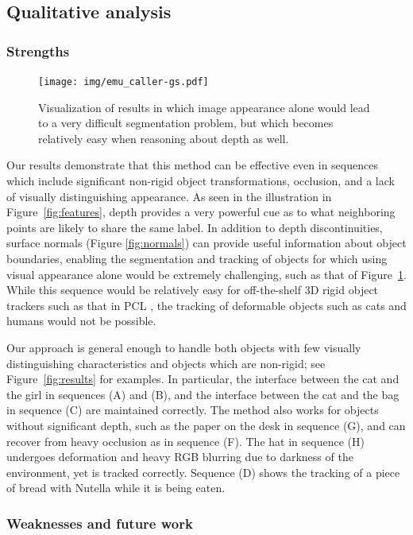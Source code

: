 \documentclass[graybox]{svmult}
\begin{document}
\subsection{Qualitative analysis}

\subsubsection{Strengths}

\begin{figure}
  \centering
  \texttt{[image: img/emu\_caller-gs.pdf]}
  \caption{Visualization of results in which image appearance alone would lead to a very difficult segmentation problem, but which becomes relatively easy when reasoning about depth as well.}
  \label{fig:emu}
\end{figure}

Our results demonstrate that this method can be effective even in sequences which include significant non-rigid object transformations, occlusion, and a lack of visually distinguishing appearance. As seen in the illustration in Figure~\ref{fig:features}, depth provides a very powerful cue as to what neighboring points are likely to share the same label.  In addition to depth discontinuities, surface normals (Figure \ref{fig:normals}) can provide useful information about object boundaries, enabling the segmentation and tracking of objects for which using visual appearance alone would be extremely challenging, such as that of Figure~\ref{fig:emu}. While this sequence would be relatively easy for off-the-shelf 3D rigid object trackers such as that in PCL \cite{rusu2011a}, the tracking of deformable objects such as cats and humans would not be possible.

Our approach is general enough to handle both objects with few visually distinguishing characteristics and objects which are non-rigid; see Figure~\ref{fig:results} for examples.  In particular, the interface between the cat and the girl in sequences (A) and (B), and the interface between the cat and the bag in sequence (C) are maintained correctly. The method also works for objects without significant depth, such as the paper on the desk in sequence (G), and can recover from heavy occlusion as in sequence (F).  The hat in sequence (H) undergoes deformation and heavy RGB blurring due to darkness of the environment, yet is tracked correctly.  Sequence (D) shows the tracking of a piece of bread with Nutella while it is being eaten.

\subsubsection{Weaknesses and future work}
\end{document}
